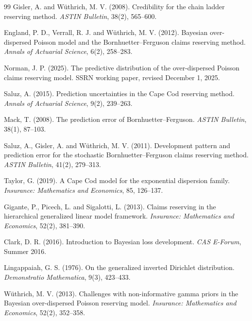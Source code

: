 \documentclass[11pt]{article}
\newcommand{\1}{\mathbf{1}}
\begin{document}
\begin{thebibliography}{99}
Gisler, A. and W\"uthrich, M. V. (2008).
\newblock Credibility for the chain ladder reserving method.
\newblock \emph{ASTIN Bulletin}, 38(2), 565--600.

England, P. D., Verrall, R. J. and W\"uthrich, M. V. (2012).
\newblock Bayesian over-dispersed Poisson model and the Bornhuetter--Ferguson claims reserving method.
\newblock \emph{Annals of Actuarial Science}, 6(2), 258--283.

Norman, J. P. (2025).
\newblock The predictive distribution of the over-dispersed Poisson claims reserving model.
\newblock SSRN working paper, revised December 1, 2025.

Saluz, A. (2015).
\newblock Prediction uncertainties in the Cape Cod reserving method.
\newblock \emph{Annals of Actuarial Science}, 9(2), 239--263.

Mack, T. (2008).
\newblock The prediction error of Bornhuetter--Ferguson.
\newblock \emph{ASTIN Bulletin}, 38(1), 87--103.

Saluz, A., Gisler, A. and W\"uthrich, M. V. (2011).
\newblock Development pattern and prediction error for the stochastic Bornhuetter--Ferguson claims reserving method.
\newblock \emph{ASTIN Bulletin}, 41(2), 279--313.

Taylor, G. (2019).
\newblock A Cape Cod model for the exponential dispersion family.
\newblock \emph{Insurance: Mathematics and Economics}, 85, 126--137.

Gigante, P., Picech, L. and Sigalotti, L. (2013).
\newblock Claims reserving in the hierarchical generalized linear model framework.
\newblock \emph{Insurance: Mathematics and Economics}, 52(2), 381--390.

Clark, D. R. (2016).
\newblock Introduction to Bayesian loss development.
\newblock \emph{CAS E-Forum}, Summer 2016.

Lingappaiah, G. S. (1976).
\newblock On the generalized inverted Dirichlet distribution.
\newblock \emph{Demonstratio Mathematica}, 9(3), 423--433.

W\"uthrich, M. V. (2013).
\newblock Challenges with non-informative gamma priors in the Bayesian over-dispersed Poisson reserving model.
\newblock \emph{Insurance: Mathematics and Economics}, 52(2), 352--358.

\end{thebibliography}
\end{document}
